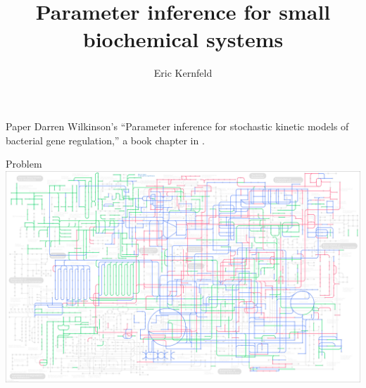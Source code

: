 \documentclass[12pt,a4paper,t,xcolor=dvipsnames,slidestop,compress,mathserif]{beamer}
\title[Likelihood-free MCMC]{Parameter inference for small biochemical systems}
\author[Eric Kernfeld]{ {Eric Kernfeld}\inst{1}}
\institute[University of Washington]
{ \inst{1}%
University of Washington Department of Statistics}
\date{}
\begin{document}
\maketitle



\begin{frame}{Paper}
Darren Wilkinson's ``Parameter inference for stochastic kinetic models of bacterial gene regulation,'' a book chapter in \cite{Bernardo2012}.

\end{frame}
\begin{frame}{Problem}
\includegraphics[scale=0.25]{human_metabolism_kegg.png}
\end{frame}
\end{document}

